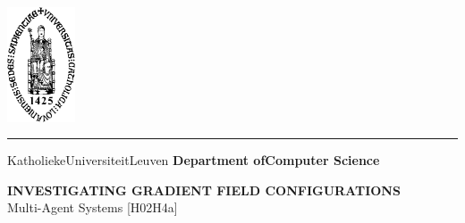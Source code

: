 \begin{titlepage}
    \newpage
    \thispagestyle{empty}
    \frenchspacing
    \hspace{-0.2cm}
    \includegraphics[height=3.4cm]{sedes}
    \hspace{0.2cm}
    \rule{0.5pt}{3.4cm}
    \hspace{0.2cm}
    \begin{minipage}[b]{8cm}
        \Large{Katholieke\newline Universiteit\newline Leuven}\smallskip\newline
        \large{}\smallskip\newline
        \textbf{Department of\newline Computer Science}\smallskip
    \end{minipage}
    \vspace*{3.2cm}\vfill
    \begin{center}
        \begin{minipage}[t]{\textwidth}
            \begin{center}
                \LARGE{\rm{\textbf{\uppercase{Investigating gradient field configurations}}}}\\
                \Large{\rm{Multi-Agent Systems [H02H4a]}}
            \end{center}
        \end{minipage}
    \end{center}
    \vfill
    \hfill{}
\end{titlepage}
